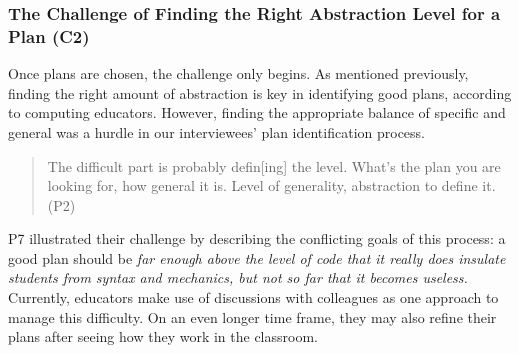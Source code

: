 \subsubsection{The Challenge of Finding the Right Abstraction Level for a Plan (C2)} 
\label{sec:challenges_abstraction}
Once plans are chosen, the challenge only begins. As mentioned previously, finding the right amount of abstraction is key in identifying good plans, according to computing educators. However, finding the appropriate balance of specific and general was a hurdle in our interviewees' plan identification process. 

\begin{quote}
    The difficult part is probably defin[ing] the level. What's the plan you are looking for, how general it is. Level of generality, abstraction to define it. (P2)
\end{quote}

P7 illustrated their challenge by describing the conflicting goals of this process: a good plan should be \textit{far enough above the level of code that it really does insulate students from syntax and mechanics, but not so far that it becomes useless.} Currently, educators make use of discussions with colleagues as one approach to manage this difficulty. On an even longer time frame, they may also refine their plans after seeing how they work in the classroom.



